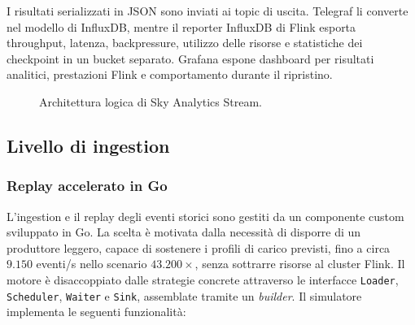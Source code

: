 \documentclass[conference]{IEEEtran}
\begin{document}
I risultati serializzati in JSON sono inviati ai topic di uscita.
Telegraf li converte nel modello di InfluxDB, mentre il reporter InfluxDB di Flink esporta throughput, latenza, backpressure, utilizzo delle risorse e statistiche dei checkpoint in un bucket separato.
Grafana espone dashboard per risultati analitici, prestazioni Flink e comportamento durante il ripristino.

\begin{figure}[t]
  \centering
  \caption{Architettura logica di Sky Analytics Stream.}
  \label{fig:architecture}
\end{figure}

\subsection{Livello di ingestion}\label{sec:ingestion}
\subsubsection{Replay accelerato in Go}
L'ingestion e il replay degli eventi storici sono gestiti da un componente custom sviluppato in Go.
La scelta è motivata dalla necessità di disporre di un produttore leggero, capace di sostenere i profili di carico previsti, fino a circa $9.150$ eventi/s nello scenario $43.200\times$, senza sottrarre risorse al cluster Flink.
Il motore è disaccoppiato dalle strategie concrete attraverso le interfacce \texttt{Loader}, \texttt{Scheduler}, \texttt{Waiter} e \texttt{Sink}, assemblate tramite un \emph{builder}.
Il simulatore implementa le seguenti funzionalità:
\end{document}
